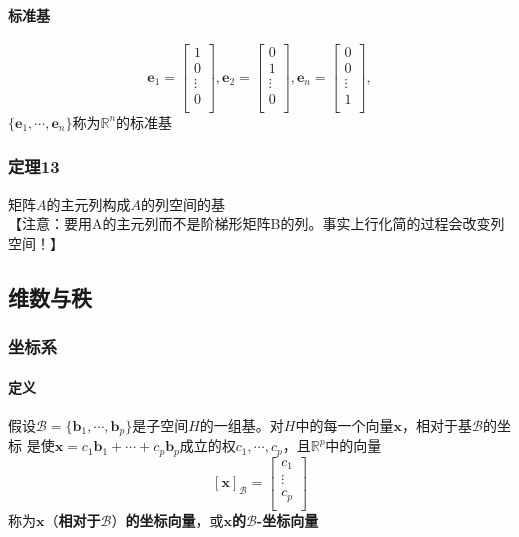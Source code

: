 \documentclass{article}
\newcommand{\ve}{\boldsymbol}
\begin{document}
\begin{CJK}{UTF8}{gkai}
\paragraph{标准基\\}
\[\ve{e}_1=
\begin{bmatrix}
1\\0\\ \vdots\\ 0\\
\end{bmatrix},
\ve{e}_2=
\begin{bmatrix}
0\\1\\ \vdots\\ 0\\
\end{bmatrix},
\ve{e}_n=
\begin{bmatrix}
0\\0\\ \vdots\\ 1\\
\end{bmatrix},
\]
$\{\ve{e}_1,\cdots,\ve{e}_n\}$称为$\mathbb{R}^n$的标准基\\
\subsubsection{定理13}
矩阵$A$的主元列构成$A$的列空间的基\\
【注意：要用A的主元列而不是阶梯形矩阵B的列。事实上行化简的过程会改变列空间！】\\
\subsection{维数与秩}
\subsubsection{坐标系}
\paragraph{定义\\}
假设$\mathcal{B}=\{\ve{b}_1,\cdots,\ve{b}_p\}$是子空间$H$的一组基。对$H$中的每一个向量$\ve{x}$，相对于基$\mathcal{B}$的坐标
是使$\ve{x}=c_1 \ve{b}_1+\cdots+c_p \ve{b}_p$成立的权$c_1,\cdots,c_p$，且$\mathbb{R}^p$中的向量\\
\[
    [\ve{x}]_{\mathcal{B}}=
\begin{bmatrix}
c_1\\
\vdots\\
c_p\\
\end{bmatrix}
\]
称为$\ve{x}$（\textbf{相对于}$\mathcal{B}$）\textbf{的坐标向量}，或$\ve{x}$\textbf{的}$\mathcal{B}$\textbf{-坐标向量}\\


\end{CJK}
\end{document}

